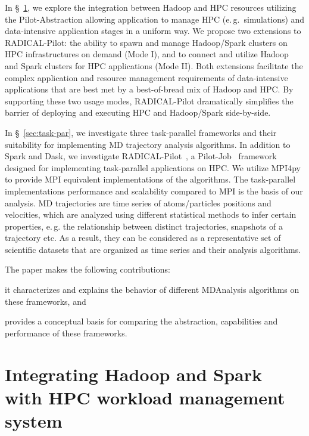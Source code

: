 \label{ch:data_hpc}
In \S~\ref{sec:pilot-data-hadoop}, we explore the integration between Hadoop and HPC resources utilizing the Pilot-Abstraction allowing application to manage HPC (e.\,g.\ simulations) and data-intensive application stages in a uniform way.
We propose two extensions to RADICAL-Pilot: the ability to spawn and manage Hadoop/Spark clusters on HPC infrastructures on demand (Mode I), and to connect and utilize Hadoop and Spark clusters for HPC applications (Mode II).
Both extensions facilitate the complex application and resource management requirements of data-intensive applications that are best met by a best-of-bread mix of Hadoop and HPC. 
By supporting these two usage modes, RADICAL-Pilot dramatically simplifies the barrier of deploying and executing HPC and Hadoop/Spark side-by-side.

In \S~\ref{sec:task-par}, we investigate three task-parallel frameworks and their suitability for implementing MD trajectory analysis algorithms.
In addition to Spark and Dask, we investigate RADICAL-Pilot~\cite{merzky2019using}, a Pilot-Job~\cite{luckow2012pstar} framework designed for implementing task-parallel applications on HPC.
We utilize MPI4py~\cite{dalcin2005mpi} to provide MPI equivalent implementations of the algorithms.
The task-parallel implementations performance and scalability compared to MPI is the basis of our analysis.
MD trajectories are time series of atoms/particles positions and velocities, which are analyzed using different statistical methods to infer certain properties, e.\,g. the relationship between distinct trajectories, snapshots of a trajectory etc.
As a result, they can be considered as a representative set of scientific datasets that are organized as time series and their analysis algorithms. 

The paper makes the following contributions: 
\begin{inparaenum}[i)]
    \item it characterizes and explains the behavior of different MDAnalysis algorithms on these frameworks, and
    \item provides a conceptual basis for comparing the abstraction, capabilities and performance of these frameworks.
\end{inparaenum}


\section{Integrating Hadoop and Spark with HPC workload management system}\label{sec:pilot-data-hadoop}

